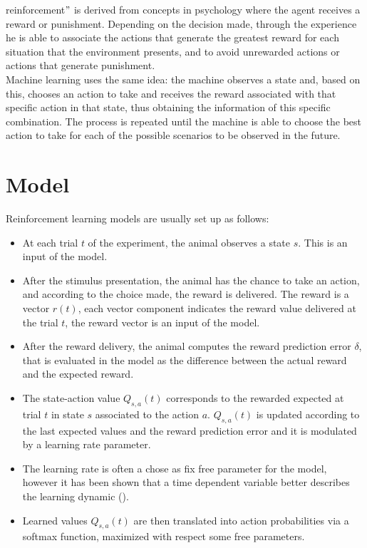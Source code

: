 reinforcement$"$ is derived from concepts in psychology where the agent receives a reward or punishment. Depending on the decision made, through the experience he is able to associate the actions that generate the greatest reward for each situation that the environment presents, and to avoid unrewarded actions or actions that generate punishment.\\Machine learning uses the same idea: the machine observes a state and, based on this, chooses an action to take and receives the reward associated with that specific action in that state, thus obtaining the information of this specific combination. The process is repeated until the machine is able to choose the best action to take for each of the possible scenarios to be observed in the future.\\
\section{Model}
\label{sec:Model}
Reinforcement learning models are usually set up as follows:
\begin{itemize}
    \item At each trial $t$ of the experiment, the animal observes a state $s$. This is an input of the model.
    \item After the stimulus presentation, the animal has the chance to take an action, and according to the choice made, the reward is delivered. The reward is a vector $r(t)$, each vector component indicates the reward value delivered at the trial $t$, the reward vector is an input of the model.
    \item After the reward delivery, the animal computes the reward prediction error $\delta$, that is evaluated in the model as the difference between the actual reward and the expected reward.
    \item The state-action value $Q_{s,a}(t)$ corresponds to the rewarded expected at trial $t$ in state $s$ associated to the action $a$. $Q_{s,a}(t)$ is updated according to the last expected values and the reward prediction error and it is modulated by a learning rate parameter.
    \item The learning rate is often a chose as fix free parameter for the model, however it has been shown that a time dependent variable better describes the learning dynamic (\cite{Funamizu}).
    \item Learned values $Q_{s,a}(t)$ are then translated into action probabilities via a softmax function, maximized with respect some free parameters.
\end{itemize}
